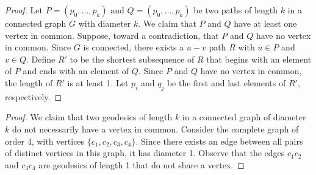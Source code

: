 \documentclass[12pt]{article}
\begin{document}
\begin{proof}
    Let $P=(p_0, \hdots, p_k)$ and $Q=(p_0, \hdots, p_k)$ be two paths of length $k$ in a connected graph $G$ with diameter $k$.
    We claim that $P$ and $Q$ have at least one vertex in common.
    Suppose, toward a contradiction, that $P$ and $Q$ have no vertex in common.
    Since $G$ is connected, there exists a $u-v$ path $R$ with $u \in P$ and $v \in Q$.
    Define $R'$ to be the shortest subsequence of $R$ that begins with an element of $P$ and ends with an element of $Q$.
    Since $P$ and $Q$ have no vertex in common, the length of $R'$ is at least 1.
    Let $p_i$ and $q_j$ be the first and last elements of $R'$, respectively.
\end{proof}

\medskip
{}
\begin{proof} %
    We claim that two geodesics of length $k$ in a connected graph of diameter $k$ do not necessarily have a vertex in common.
    Consider the complete graph of order 4, with vertices $\{c_1, c_2, c_3, c_4\}$.
    Since there exists an edge between all pairs of distinct vertices in this graph, it has diameter 1.
    Observe that the edges $c_1c_2$ and $c_3c_4$ are geodesics of length 1 that do not share a vertex.
\end{proof}

\bigskip
{}
\end{document}
